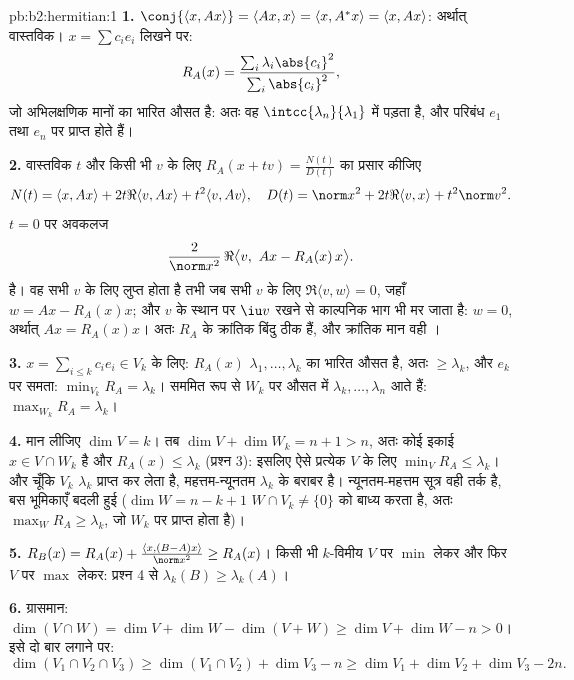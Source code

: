\begin{solution}{pb:b2:hermitian:1}
\textbf{1.} $\conj{\langle x, Ax\rangle} = \langle Ax, x\rangle
= \langle x, A^*x\rangle = \langle x, Ax\rangle$: अर्थात् वास्तविक। $x = \sum c_ie_i$ लिखने पर:
\[
R_A(x) = \frac{\sum_i\lambda_i\abs{c_i}^2}
{\sum_i\abs{c_i}^2} ,
\]
जो अभिलक्षणिक मानों का भारित औसत है: अतः वह $\intcc{\lambda_n}{\lambda_1}$ में पड़ता है, और परिबंध
$e_1$ तथा $e_n$ पर प्राप्त होते हैं।

\textbf{2.} वास्तविक $t$ और किसी भी $v$ के लिए $R_A(x + tv) =
\frac{N(t)}{D(t)}$ का प्रसार कीजिए
\[
N(t) = \langle x, Ax\rangle + 2t\Re\langle v, Ax\rangle +
t^2\langle v, Av\rangle,
\quad
D(t) = \norm x^2 + 2t\Re\langle v, x\rangle + t^2\norm v^2 .
\]
$t = 0$ पर अवकलज
\[
\frac{2}{\norm x^2}\,
\Re\bigl\langle v,\ Ax - R_A(x)\,x\bigr\rangle .
\]
है। वह सभी $v$ के लिए लुप्त होता है तभी जब सभी $v$ के लिए $\Re\langle v, w\rangle = 0$, जहाँ $w = Ax - R_A(x)x$;
और $v$ के स्थान पर $\iu v$ रखने से काल्पनिक भाग भी मर जाता है: $w = 0$,
अर्थात् $Ax = R_A(x)x$। अतः $R_A$ के क्रांतिक बिंदु ठीक  हैं, और
क्रांतिक मान वही ।

\textbf{3.} $x = \sum_{i\leq k}c_ie_i \in V_k$ के लिए: $R_A(x)$ $\lambda_1, \dots, \lambda_k$ का भारित औसत है, अतः $\geq \lambda_k$, और $e_k$ पर समता:
$\min_{V_k} R_A =
\lambda_k$। सममित रूप से $W_k$ पर औसत में $\lambda_k, \dots, \lambda_n$ आते हैं: $\max_{W_k}R_A = \lambda_k$।

\textbf{4.} मान लीजिए $\dim V = k$। तब $\dim V + \dim W_k = n + 1 >
n$, अतः कोई इकाई $x \in V \cap W_k$ है और $R_A(x) \leq
\lambda_k$ (प्रश्न 3):
इसलिए ऐसे प्रत्येक $V$ के लिए $\min_{V}R_A \leq \lambda_k$। और चूँकि $V_k$ $\lambda_k$ प्राप्त कर लेता है,
महत्तम-न्यूनतम $\lambda_k$ के बराबर है। न्यूनतम-महत्तम सूत्र वही तर्क है, बस
भूमिकाएँ बदली हुई ($\dim W = n - k + 1$ $W \cap V_k \neq
\{0\}$ को बाध्य करता है, अतः $\max_W R_A \geq \lambda_k$, जो $W_k$ पर
प्राप्त होता है)।

\textbf{5.}  $R_B(x) = R_A(x) + \frac{\langle x,
(B-A)x\rangle}{\norm x^2} \geq R_A(x)$। किसी भी $k$-विमीय $V$ पर $\min$ लेकर और फिर $V$ पर
$\max$ लेकर: प्रश्न 4 से $\lambda_k(B) \geq \lambda_k(A)$।

\textbf{6.} ग्रासमान: $\dim(V\cap W) = \dim V + \dim W -
\dim(V + W) \geq \dim V + \dim W - n > 0$। इसे दो बार लगाने पर:
\[
\dim(V_1\cap V_2\cap V_3)
\geq \dim(V_1\cap V_2) + \dim V_3 - n
\geq \dim V_1 + \dim V_2 + \dim V_3 - 2n .
\]


\end{solution}
